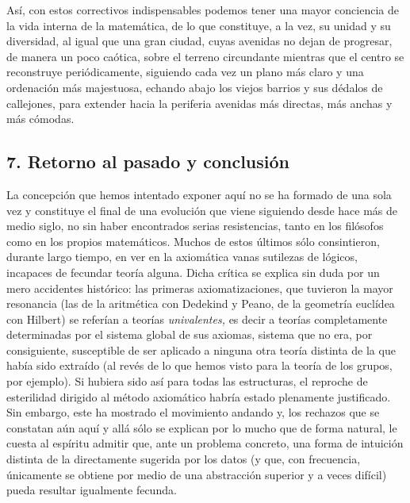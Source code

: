 \documentclass[a4paper, 12pt, draft]{article}
\begin{document}
Así, con estos correctivos indispensables podemos tener una mayor conciencia de la vida interna de la matemática, de lo que constituye, a la vez, su unidad y su diversidad, al igual que una gran ciudad, cuyas avenidas no dejan de progresar, de manera un poco caótica, sobre el terreno circundante mientras que el centro se reconstruye periódicamente, siguiendo cada vez un plano más claro y una ordenación más majestuosa, echando abajo los viejos barrios y sus dédalos de callejones, para extender hacia la periferia avenidas más directas, más anchas y más cómodas.

\subsection*{7. Retorno al pasado y conclusión}

La concepción que hemos intentado exponer aquí no se ha formado de una sola vez y constituye el final de una evolución que viene siguiendo desde hace más de medio siglo, no sin haber encontrados serias resistencias, tanto en los filósofos como en los propios matemáticos. Muchos de estos últimos sólo consintieron, durante largo tiempo, en ver en la axiomática vanas sutilezas de lógicos, incapaces de fecundar teoría alguna. Dicha crítica se explica sin duda por un mero accidentes histórico: las primeras axiomatizaciones, que tuvieron la mayor resonancia (las de la aritmética con Dedekind y Peano, de la geometría euclídea con Hilbert) se referían a teorías \textit{univalentes,} es decir a teorías completamente determinadas por el sistema global de sus axiomas, sistema que no era, por consiguiente, susceptible de ser aplicado a ninguna otra teoría distinta de la que había sido extraído (al revés de lo que hemos visto para la teoría de los grupos, por ejemplo). Si hubiera sido así para todas las estructuras, el reproche de esterilidad dirigido al método axiomático habría estado plenamente justificado. Sin embargo, este ha mostrado el movimiento andando y, los rechazos que se constatan aún aquí y allá sólo se explican por lo mucho que de forma natural, le cuesta al espíritu admitir que, ante un problema concreto, una forma de intuición distinta de la directamente sugerida por los datos (y que, con frecuencia, únicamente se obtiene por medio de una abstracción superior y a veces difícil) pueda resultar igualmente fecunda.
\end{document}
